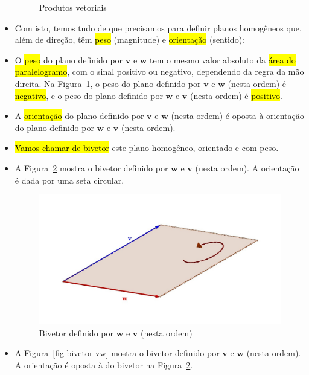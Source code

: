 \documentclass[
  letterpaper,
  DIV=11,
  numbers=noendperiod]{scrreprt}
\begin{document}
\begin{itemize}
\begin{figure}[t]
{  }

  \caption{\label{fig-prod-vet}Produtos vetoriais}

  \end{figure}
\item
  Com isto, temos tudo de que precisamos para definir planos homogêneos
  que, além de direção, têm {\hl{peso}} (magnitude) e {\hl{orientação}}
  (sentido):
\item
  O {\hl{peso}} do plano definido por $\mathbf{v}$ e $\mathbf{w}$ tem o
  mesmo valor absoluto da {\hl{área do paralelogramo}}, com o sinal
  positivo ou negativo, dependendo da regra da mão direita. Na
  Figura~\ref{fig-prod-vet}, o peso do plano definido por $\mathbf{v}$ e
  $\mathbf{w}$ (nesta ordem) é {\hl{negativo}}, e o peso do plano
  definido por $\mathbf{w}$ e $\mathbf{v}$ (nesta ordem) é
  {\hl{positivo}}.
\item
  A {\hl{orientação}} do plano definido por $\mathbf{v}$ e $\mathbf{w}$
  (nesta ordem) é oposta à orientação do plano definido por $\mathbf{w}$
  e $\mathbf{v}$ (nesta ordem).
\item
  {\hl{Vamos chamar de bivetor}} este plano homogêneo, orientado e com
  peso.
\item
  A Figura~\ref{fig-bivetor-wv} mostra o bivetor definido por
  $\mathbf{w}$ e $\mathbf{v}$ (nesta ordem). A orientação é dada por uma
  seta circular.

  \begin{figure}[t]

  {\centering \includegraphics[width=1\textwidth,height=\textheight]{figures/bivetor-wv.jpg}

  }

  \caption{\label{fig-bivetor-wv}Bivetor definido por $\mathbf{w}$ e
  $\mathbf{v}$ (nesta ordem)}

  \end{figure}
\item
  A Figura~\ref{fig-bivetor-vw} mostra o bivetor definido por
  $\mathbf{v}$ e $\mathbf{w}$ (nesta ordem). A orientação é oposta à do
  bivetor na Figura~\ref{fig-bivetor-wv}.


\end{itemize}
\end{document}
